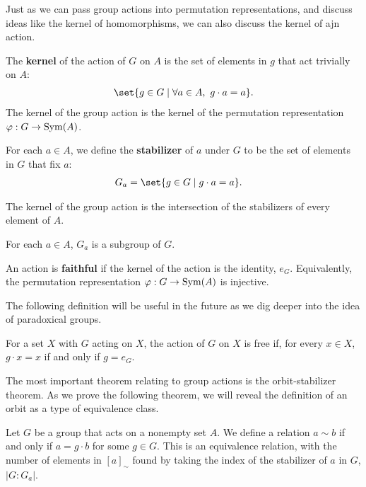 Just as we can pass group actions into permutation representations, and discuss ideas like the kernel of homomorphisms, we can also discuss the kernel of ajn action.
\begin{definition}[Kernel]
  The \textbf{kernel} of the action of $G$ on $A$ is the set of elements in $g$ that act trivially on $A$:
  \begin{align*}
    \set{g\in G\mid \forall a\in A,~g\cdot a = a}.
  \end{align*}
  The kernel of the group action is the kernel of the permutation representation $\varphi: G\rightarrow \operatorname{Sym}(A)$.
\end{definition}
\begin{definition}[Stabilizer]
  For each $a\in A$, we define the \textbf{stabilizer} of $a$ under $G$ to be the set of elements in $G$ that fix $a$:
  \begin{align*}
    G_a &= \set{g\in G\mid g\cdot a = a}.
  \end{align*}
\end{definition}
\begin{remark}
The kernel of the group action is the intersection of the stabilizers of every element of $A$.\newline

For each $a\in A$, $G_{a}$ is a subgroup of $G$.
\end{remark}
\begin{definition}
  An action is \textbf{faithful} if the kernel of the action is the identity, $e_G$. Equivalently, the permutation representation $\varphi: G\rightarrow \operatorname{Sym}(A)$ is injective.
\end{definition}
The following definition will be useful in the future as we dig deeper into the idea of paradoxical groups.
\begin{definition}
For a set $X$ with $G$ acting on $X$, the action of $G$ on $X$ is free if, for every $x\in X$, $g\cdot x = x$ if and only if $g = e_G$.
\end{definition}
The most important theorem relating to group actions is the orbit-stabilizer theorem. As we prove the following theorem, we will reveal the definition of an orbit as a type of equivalence class.
\begin{theorem}
  Let $G$ be a group that acts on a nonempty set $A$. We define a relation $a\sim b$ if and only if $a = g\cdot b$ for some $g\in G$. This is an equivalence relation, with the number of elements in $\left[a\right]_{\sim}$ found by taking the index of the stabilizer of $a$ in $G$, $\left\vert G:G_a \right\vert$.
\end{theorem}
